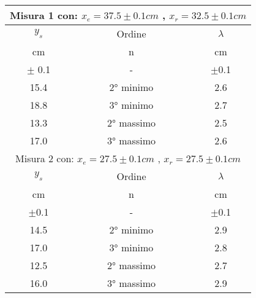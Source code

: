 \begin{table}[H]
\begin{center}
\begin{tabular}{|c|c|c|}
%	
    \multicolumn{3}{c}{Misura 1 con: $ x_e = 37.5 \pm 0.1 cm $ , $ x_r = 32.5 \pm 0.1 cm$}\\ \hline
    $y_s$	&	Ordine	&	$\lambda$	\\
    cm	&	n	&	cm	\\
    $\pm$ 0.1	&	-	&	$\pm$0.1	\\\hline
    15.4	&	2° minimo	&	2.6	\\
    18.8	&	3° minimo	&	2.7	\\
    13.3	&	2° massimo	&	2.5	\\
    17.0	&	3° massimo	&	2.6	\\ \hline
%
    \multicolumn{3}{c}{Misura 2 con: $ x_e = 27.5 \pm 0.1 cm $ , $ x_r = 27.5 \pm0.1 cm$} \\ \hline
%
    $y_s$	&	Ordine	&	$\lambda$	\\
    cm	&	n	&	cm	\\
    $\pm$0.1	&	-	&	$\pm$0.1	\\ \hline
    14.5	&	2° minimo	&	2.9	\\
    17.0	&	3° minimo	&	2.8	\\
    12.5	&	2° massimo	&	2.7	\\
    16.0	&	3° massimo	&	2.9	\\ \hline
\end{tabular}
\end{center}
\end{table}